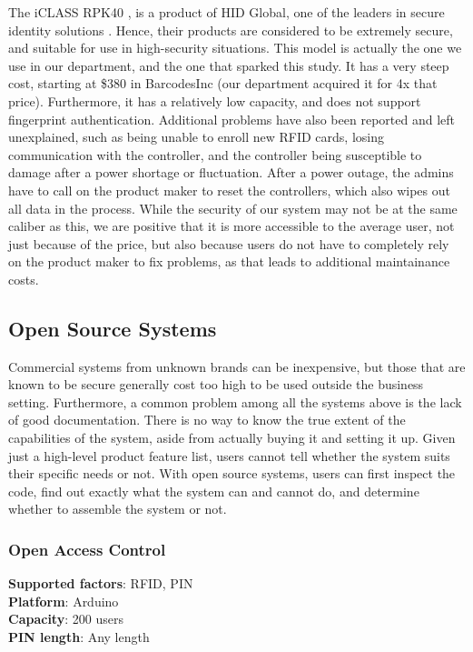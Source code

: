 \noindent The iCLASS RPK40 \cite{HID_RPK40}, is a product of HID Global, one of the leaders in secure identity solutions \cite{HID_About}. Hence, their products are considered to be extremely secure, and suitable for use in high-security situations. This model is actually the one we use in our department, and the one that sparked this study. It has a very steep cost, starting at \$380 in BarcodesInc \cite{HID_RPK40_Price} (our department acquired it for 4x that price). Furthermore, it has a relatively low capacity, and does not support fingerprint authentication. Additional problems have also been reported and left unexplained, such as being unable to enroll new RFID cards, losing communication with the controller, and the controller being susceptible to damage after a power shortage or fluctuation. After a power outage, the admins have to call on the product maker to reset the controllers, which also wipes out all data in the process. While the security of our system may not be at the same caliber as this, we are positive that it is more accessible to the average user, not just because of the price, but also because users do not have to completely rely on the product maker to fix problems, as that leads to additional maintainance costs.

\pagebreak

\subsection{Open Source Systems}

Commercial systems from unknown brands can be inexpensive, but those that are known to be secure generally cost too high to be used outside the business setting. Furthermore, a common problem among all the systems above is the lack of good documentation. There is no way to know the true extent of the capabilities of the system, aside from actually buying it and setting it up. Given just a high-level product feature list, users cannot tell whether the system suits their specific needs or not. With open source systems, users can first inspect the code, find out exactly what the system can and cannot do, and determine whether to assemble the system or not.

\subsubsection{Open Access Control}
\begin{spacing}{1.35}
\textbf{Supported factors}: RFID, PIN \\
\textbf{Platform}: Arduino \\
\textbf{Capacity}: 200 users \\
\textbf{PIN length}: Any length \\
\end{spacing}

